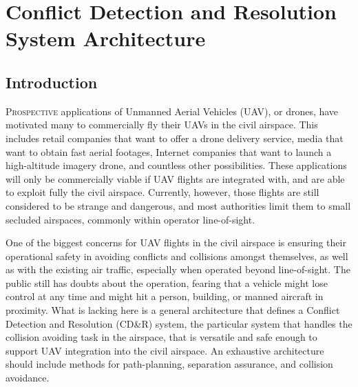 \chapter{Conflict Detection and Resolution System Architecture} %
\label{Ch:Architecture}

\section{Introduction}
\lettrine[lines=3, nindent=0pt]{P}{rospective} applications of Unmanned Aerial Vehicles (UAV), or drones, have motivated many to commercially fly their UAVs in the civil airspace. This includes retail companies that want to offer a drone delivery service\footnotemark[1], media that want to obtain fast aerial footages\footnotemark[2], Internet companies that want to launch a high-altitude imagery drone\footnotemark[3], and countless other possibilities\cite{degarmo:04}. %
These applications will only be commercially viable if UAV flights are integrated with, and are able to exploit fully the civil airspace. Currently, however, those flights are still considered to be strange and dangerous, and most authorities limit them to small secluded airspaces, commonly within operator line-of-sight\cite{CAP722}. 

One of the biggest concerns for UAV flights in the civil airspace is ensuring their operational safety in avoiding conflicts and collisions amongst themselves, as well as with the existing air traffic, especially when operated beyond line-of-sight. The public still has doubts about the operation, fearing that a vehicle might lose control at any time and might hit a person, building, or manned aircraft in proximity. What is lacking here is a general architecture that defines a Conflict Detection and Resolution (CD\&R) system, the particular system that handles the collision avoiding task in the airspace, that is versatile and safe enough to support UAV integration into the civil airspace. An exhaustive architecture should include methods for path-planning, separation assurance, and collision avoidance.
%

